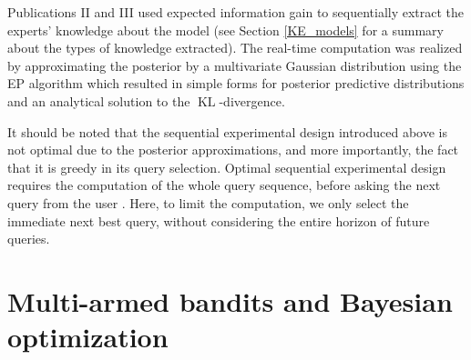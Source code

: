\documentclass[dissertation,math,vertlayout,pdfa,colorlinks]{aaltoseries}
\DeclareMathOperator{\KLt}{KL}
\begin{document}
Publications II and III used expected information gain to sequentially extract the experts' knowledge about the model (see Section \ref{KE_models} for a summary about the types of knowledge extracted). The real-time computation was realized by approximating the posterior by a multivariate Gaussian distribution using the EP algorithm which resulted in simple forms for posterior predictive distributions and an analytical solution to the $\KLt$-divergence.   


It should be noted that the sequential experimental design introduced above is not optimal due to the posterior approximations, and more importantly, the fact that it is greedy in its query selection. Optimal sequential experimental design requires the computation of the whole query sequence, before asking the next query from the user \cite{huan2016sequential}. Here, to limit the computation, we only select the immediate next best query, without considering the entire horizon of future queries. 

 

\section{Multi-armed bandits and Bayesian optimization}\label{MAP_and_BO}
\end{document}
